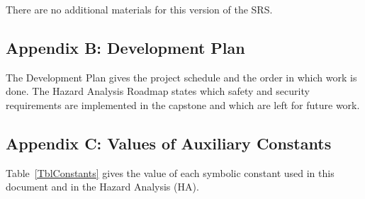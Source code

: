 \documentclass[12pt]{article}
\begin{document}
There are no additional materials for this version of the SRS.

\subsection{Appendix B: Development Plan}

The Development Plan gives the project schedule and the order in which work is
done. The Hazard Analysis Roadmap states which safety and security requirements
are implemented in the capstone and which are left for future work.

\subsection{Appendix C: Values of Auxiliary Constants}

Table~\ref{TblConstants} gives the value of each symbolic constant used in this
document and in the Hazard Analysis (HA).
\end{document}
